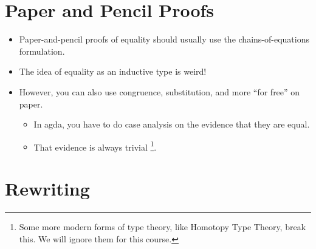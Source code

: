 \documentclass{lecturenotes}
\begin{document}
\section{Paper and Pencil Proofs}
\label{sec:paper-pencil-proofs}

\begin{itemize}
\item Paper-and-pencil proofs of equality should usually use the chains-of-equations formulation.
\item The idea of equality as an inductive type is weird!
\item However, you can also use congruence, substitution, and more ``for free'' on paper.
  \begin{itemize}
  \item In agda, you have to do case analysis on the evidence that they are equal.
  \item That evidence is always trivial%
    \footnote{Some more modern forms of type theory, like Homotopy Type Theory, break this.
      We will ignore them for this course.}.
  \end{itemize}
\end{itemize}

\section{Rewriting}
\label{sec:rewriting}
\end{document}
